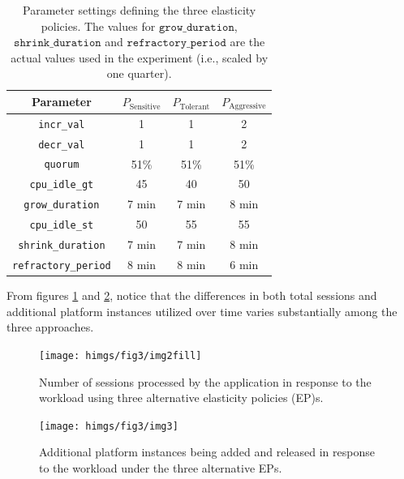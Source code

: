 \begin{table}[h]
\caption{Parameter settings defining the three elasticity
policies. The values for $\texttt{grow\_duration}$, $\texttt{shrink\_duration}$ and $\texttt{refractory\_period}$ are the actual values used in the experiment (i.e., scaled by one quarter).}\label{tab:ps}
\center
\begin{tabular}{ ||c || c | c | c| }
  \hline
   Parameter & $P_\text{Sensitive}$ & $P_\text{Tolerant}$ & $P_\text{Aggressive}$ \\
   \hline \hline                       
   \texttt{incr\_val}      & 1 & 1 & 2  \\
   \texttt{decr\_val}      & 1 & 1 & 2  \\
   \texttt{quorum}         & 51\% & 51\% & 51\% \\
   \texttt{cpu\_idle\_gt}  & 45   & 40   & 50   \\
   \texttt{grow\_duration} & 7 min & 7 min & 8 min \\ 	
   \texttt{cpu\_idle\_st}  & 50 & 55 & 55 \\
   \texttt{shrink\_duration} & 7 min & 7 min & 8 min \\
   \texttt{refractory\_period} & 8 min & 8 min & 6 min \\
  \hline  \hline
\end{tabular}
\end{table}

From figures \ref{fig:scenario_number_of_sessions} and \ref{fig:scenario_additional_platform_instances}, notice that the differences in both total sessions and additional platform instances utilized over time varies substantially among the three approaches.   
   

	\begin{figure}
   \centering	
    \label{fig:csps123}\texttt{[image: himgs/fig3/img2fill]}
  \caption{ Number of sessions processed by the application in response to the workload using
 three alternative elasticity policies (EP)s.  }
\label{fig:scenario_number_of_sessions}
 \end{figure} 

	\begin{figure}
   \centering
    \label{fig:ipps123}\texttt{[image: himgs/fig3/img3]}
 \caption{ Additional platform instances being added and released in response to the workload under the three alternative EPs.}
\label{fig:scenario_additional_platform_instances}
 \end{figure} 
  



